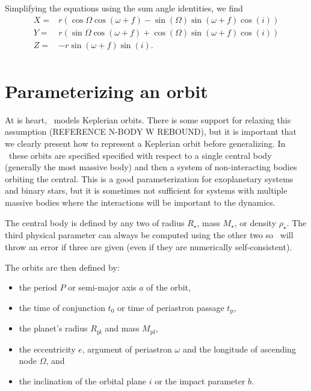 \documentclass[modern]{aastex62}
\begin{document}
Simplifying the equations using the sum angle identities, we find
\begin{equation}
  \begin{array}{lc}
    X =& r (\cos \Omega \cos(\omega + f) - \sin(\Omega) \sin(\omega + f) \cos(i)) \\
    Y =& r (\sin \Omega \cos(\omega + f) + \cos(\Omega) \sin(\omega + f) \cos(i)) \\
    Z =& - r \sin(\omega + f) \sin(i).\\
\end{array}
\label{eqn:Z}
\end{equation}

\section{Parameterizing an orbit}

At is heart, \exoplanet\ models Keplerian orbits.
There is some support for relaxing this assumption (REFERENCE N-BODY W REBOUND), but it is important that we clearly present how to represent a Keplerian orbit before generalizing.
In \exoplanet\ these orbits are specified specified with respect to a single central body (generally the most massive body) and then a system of non-interacting bodies orbiting the central.
This is a good parameterization for exoplanetary systems and binary stars, but it is sometimes not sufficient for systems with multiple massive bodies where the interactions will be important to the dynamics.

The central body is defined by any two of radius $R_\star$, mass $M_\star$, or density $\rho_\star$.
The third physical parameter can always be computed using the other two so \exoplanet\ will throw an error if three are given (even if they are numerically self-consistent).

The orbits are then defined by:
\begin{itemize}
  \item the period $P$ or semi-major axis $a$ of the orbit,
  \item the time of conjunction $t_0$ or time of periastron passage $t_\mathrm{p}$,
  \item the planet's radius $R_\mathrm{pl}$ and mass $M_\mathrm{pl}$,
  \item the eccentricity $e$, argument of periastron $\omega$ and the longitude of ascending node $\Omega$, and
  \item the inclination of the orbital plane $i$ or the impact parameter $b$.
\end{itemize}
\end{document}
